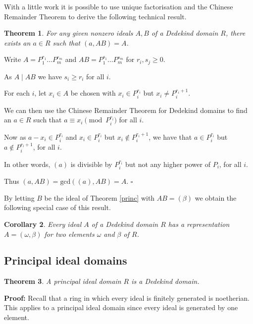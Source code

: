 \documentclass[10pt]{article}
\newcommand{\qed}{\square}
\newtheorem{theorem}{Theorem}[section]
\newtheorem{corollary}[theorem]{Corollary}
\newenvironment{proof}[1][Proof]{\begin{trivlist}
\item[\hskip \labelsep {\bfseries #1}]}{\end{trivlist}}
\begin{document}
With a little work it is possible to use unique factorisation and the Chinese Remainder Theorem to derive the following technical result.

\begin{theorem}\label{abw}
For any given nonzero ideals $A, B$ of a Dedekind domain $R$, there exists an $a \in R$ such that $(a, AB) = A$. 
\end{theorem}

\begin{proof}
Write $A = P_1^{r_1}\ldots P_m^{r_m}$ and $AB = P_1^{s_1}\ldots P_m^{s_m}$ for $r_i, s_j \geq 0$.

As $A \mid AB$ we have $s_i \geq r_i$ for all $i$.

For each $i$, let $x_i \in A$ be chosen with $x_i \in P_i^{r_i}$ but $x_i \neq P_i^{r_i + 1}$.

We can then use the Chinese Remainder Theorem for Dedekind domains to find an $a \in R$ such that $a \equiv x_i \pmod{P_i^{r_i}}$ for all $i$.

Now as $a - x_i \in P_i^{r_i}$ and $x_i \in P_i^{r_i}$ but $x_i \notin P_i^{r_i + 1}$, we have that $a \in P_i^{r_i}$ but $a \notin P_i^{r_i + 1}$, for all $i$.

In other words, $(a)$ is divisible by $P_i^{r_i}$ but not any higher power of $P_i$, for all $i$.

Thus $(a, AB) = \mbox{gcd}((a), AB) = A$.
$\qed$
\end{proof}

By letting $B$ be the ideal of Theorem \ref{princ} with $AB = (\beta)$ we obtain the following special case of this result.

\begin{corollary}
Every ideal $A$ of a Dedekind domain $R$ has a representation $A = (\omega, \beta)$ for \emph{two} elements $\omega$ and
$\beta$ of $R$.
\end{corollary}

\subsection{Principal ideal domains}

\begin{theorem}
A principal ideal domain $R$ is a Dedekind domain.
\end{theorem}

\textbf{Proof:}
Recall that a ring in which every ideal is finitely generated is noetherian. This applies to a principal ideal domain since every ideal is generated by one element.
\end{document}
